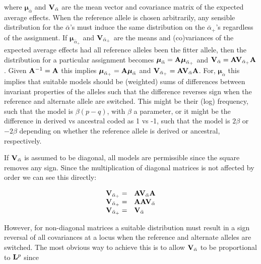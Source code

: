 \documentclass[12pt]{article}
\begin{document}
\begin{bibunit}
where $\boldsymbol{\mu}_{\bar{\alpha}}$ and ${\bf V}_{\bar{\alpha}}$ are the mean vector and covariance matrix of the expected average effects. When the reference allele is chosen arbitrarily, any sensible distribution for the $\bar{\alpha}$'s must induce the same distribution on the $\bar{\alpha}_{+}$'s regardless of the assignment. If ${\boldsymbol \mu}_{\bar{\alpha}_{+}}$ and ${\bf V}_{\bar{\alpha}_{+}}$ are the means and (co)variances of the expected average effects had all reference alleles been the fitter allele, then the distribution for a particular assignment becomes ${\boldsymbol \mu}_{\bar{\alpha}}={\bf A}{\boldsymbol \mu}_{\bar{\alpha}_{+}}$ and ${\bf V}_{\bar{\alpha}} = {\bf A}{\bf V}_{\bar{\alpha}_{+}}{\bf A}$. Given ${\bf A}^{-1}={\bf A}$ this implies  ${\boldsymbol \mu}_{\bar{\alpha}_{+}}={\bf A}{\boldsymbol \mu}_{\bar{\alpha}}$ and ${\bf V}_{\bar{\alpha}_{+}}={\bf A}{\bf V}_{\bar{\alpha}}{\bf A}$. For, ${\boldsymbol \mu}_{\alpha}$ this implies that suitable models should be (weighted) sums of differences between invariant properties of the alleles such that the difference reverses sign when the reference and alternate allele are switched. This might be their (log) frequency, such that the model is $\beta(p-q)$, with $\beta$ a parameter, or it might be the difference in derived vs ancestral coded as 1 vs -1, such that the model is $2\beta$ or $-2\beta$ depending on whether the reference allele is derived or ancestral, respectively. 

If ${\bf V}_{\bar{\alpha}}$ is assumed to be diagonal, all models are permissible since the square removes any sign. Since the multiplication of diagonal matrices is not affected by order we can see this directly:

\begin{equation}
\begin{array}{rl}
{\bf V}_{\bar{\alpha}_{+}} =& {\bf A}{\bf V}_{\bar{\alpha}}{\bf A}\\
{\bf V}_{\bar{\alpha}_{+}} =& {\bf A}{\bf A}{\bf V}_{\bar{\alpha}}\\
{\bf V}_{\bar{\alpha}_{+}} =& {\bf V}_{\bar{\alpha}}\\
\end{array}
\end{equation}

However, for non-diagonal matrices a suitable distribution must result in a sign reversal of all covariances at a locus when the reference and alternate alleles are switched. The most obvious way to achieve this is to allow ${\bf V}_{\bar{\alpha}}$ to be proportional to ${\bf L}^{p}$ since


\end{bibunit}
\end{document}
